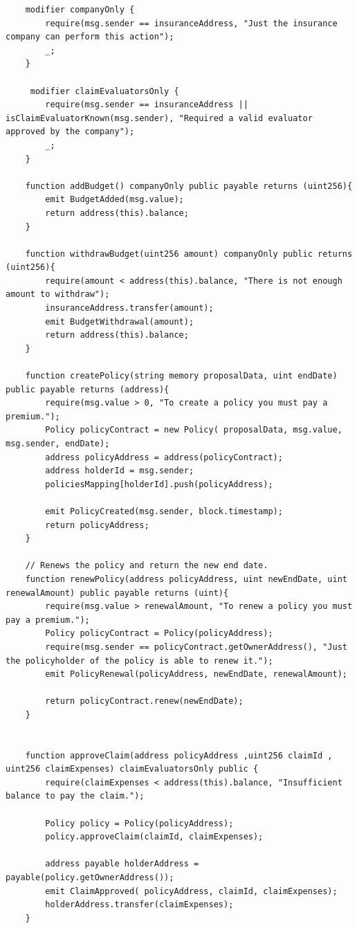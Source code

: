 \documentclass[a4paper,12pt]{article}
\begin{document}
\begin{appendices}
\begin{lstlisting}
    modifier companyOnly {
        require(msg.sender == insuranceAddress, "Just the insurance company can perform this action");
        _;
    }

     modifier claimEvaluatorsOnly {
        require(msg.sender == insuranceAddress || isClaimEvaluatorKnown(msg.sender), "Required a valid evaluator approved by the company");
        _;
    }

    function addBudget() companyOnly public payable returns (uint256){
        emit BudgetAdded(msg.value);
        return address(this).balance;
    }

    function withdrawBudget(uint256 amount) companyOnly public returns (uint256){
        require(amount < address(this).balance, "There is not enough amount to withdraw");
        insuranceAddress.transfer(amount);
        emit BudgetWithdrawal(amount);
        return address(this).balance;
    }

    function createPolicy(string memory proposalData, uint endDate) public payable returns (address){
        require(msg.value > 0, "To create a policy you must pay a premium.");
        Policy policyContract = new Policy( proposalData, msg.value, msg.sender, endDate);
        address policyAddress = address(policyContract);
        address holderId = msg.sender;
        policiesMapping[holderId].push(policyAddress);

        emit PolicyCreated(msg.sender, block.timestamp);
        return policyAddress;
    }

    // Renews the policy and return the new end date.
    function renewPolicy(address policyAddress, uint newEndDate, uint renewalAmount) public payable returns (uint){
        require(msg.value > renewalAmount, "To renew a policy you must pay a premium.");
        Policy policyContract = Policy(policyAddress);
        require(msg.sender == policyContract.getOwnerAddress(), "Just the policyholder of the policy is able to renew it.");
        emit PolicyRenewal(policyAddress, newEndDate, renewalAmount);

        return policyContract.renew(newEndDate);
    }


    function approveClaim(address policyAddress ,uint256 claimId , uint256 claimExpenses) claimEvaluatorsOnly public {
        require(claimExpenses < address(this).balance, "Insufficient balance to pay the claim.");

        Policy policy = Policy(policyAddress);
        policy.approveClaim(claimId, claimExpenses);

        address payable holderAddress = payable(policy.getOwnerAddress());
        emit ClaimApproved( policyAddress, claimId, claimExpenses);
        holderAddress.transfer(claimExpenses);
    }


\end{lstlisting}
\end{appendices}
\end{document}
